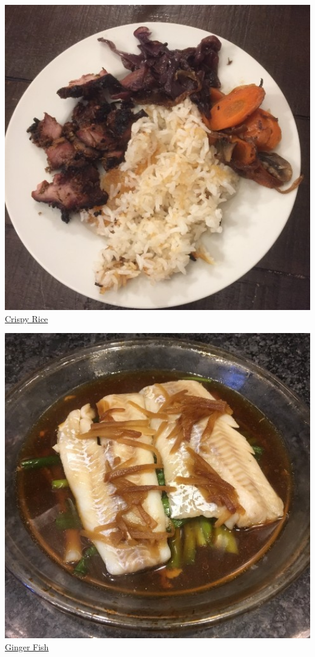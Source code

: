 \documentclass[
]{book}
\begin{document}
\protect\hyperlink{crispyrice}{\includegraphics[width=1\textwidth,height=\textheight]{crispy_rice_small.jpg}}
\protect\hyperlink{crispyrice}{Crispy Rice}

\protect\hyperlink{gingerfish}{\includegraphics[width=1\textwidth,height=\textheight]{ginger_fish_small.jpg}}
\protect\hyperlink{gingerfish}{Ginger Fish}
\end{document}
